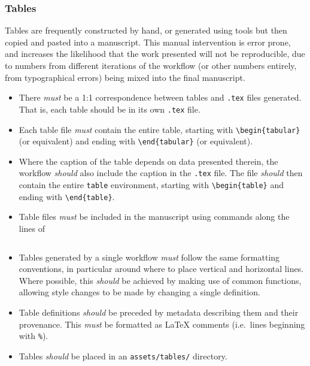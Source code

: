 \documentclass{article}
\newcommand\rfcword[1]{\emph{#1}\xspace}
\newcommand\must{\rfcword{must}}
\newcommand\should{\rfcword{should}}
\newcommand\filename[1]{\texttt{#1}\xspace}
\begin{document}
\subsubsection{Tables}

Tables are frequently constructed by hand,
or generated using tools but then copied and pasted into a manuscript.
This manual intervention is error prone,
and increases the likelihood that the work presented will not be reproducible,
due to numbers from different iterations of the workflow
(or other numbers entirely,
from typographical errors)
being mixed into the final manuscript.

\begin{itemize}
  \item
        There \must be a 1:1 correspondence between tables and \filename{.tex} files generated.
        That is,
        each table should be in its own \filename{.tex} file.
  \item
        Each table file \must contain the entire table,
        starting with \verb|\begin{tabular}|
        (or equivalent)
        and ending with \verb|\end{tabular}|
        (or equivalent).
  \item
        Where the caption of the table depends on data presented therein,
        the workflow \should also include the caption in the \filename{.tex} file.
        The file \should then contain the entire \verb|table| environment,
        starting with \verb|\begin{table}|
        and ending with \verb|\end{table}|.
  \item
        Table files \must be included in the manuscript using commands along the lines of
\begin{verbatim}

\end{verbatim}
  \item
        Tables generated by a single workflow
        \must follow the same formatting conventions,
        in particular around where to place vertical and horizontal lines.
        Where possible,
        this \should be achieved by making use of common functions,
        allowing style changes to be made by changing a single definition.
  \item
        Table definitions \should be preceded by metadata describing them and their provenance.
        This \must be formatted as LaTeX comments
        (i.e.\ lines beginning with \verb|%|).
  \item
        Tables \should be placed in an \filename{assets/tables/} directory.
\end{itemize}
\end{document}
